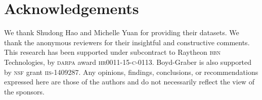 \section*{Acknowledgements}

We thank Shudong Hao and Michelle Yuan for providing their datasets. 
%
We thank the anonymous reviewers for their insightful and constructive
comments.
%
This research has been supported under subcontract to Raytheon
\textsc{bbn} Technologies, by \textsc{darpa} award
\textsc{hr}0011-15-\textsc{c}-0113.
%
Boyd-Graber is also supported by \textsc{nsf} grant
\textsc{iis}-1409287.
%
Any opinions, findings, conclusions, or recommendations expressed here
are those of the authors and do not necessarily reflect the view of
the sponsors.
